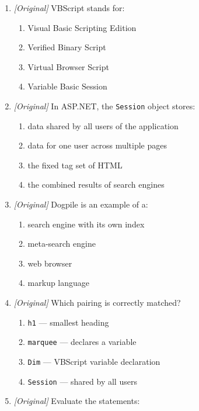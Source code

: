 \begin{enumerate}[label=\textbf{Q\arabic*.}, leftmargin=*]
\begin{enumerate}[label=\Alph*.]
    \item join two strings
    \item store data for one user on the server
  \end{enumerate}
\item \textit{[Original]} VBScript stands for:
  \begin{enumerate}[label=\Alph*.]
    \item Visual Basic Scripting Edition
    \item Verified Binary Script
    \item Virtual Browser Script
    \item Variable Basic Session
  \end{enumerate}
\item \textit{[Original]} In ASP.NET, the \texttt{Session} object stores:
  \begin{enumerate}[label=\Alph*.]
    \item data shared by all users of the application
    \item data for one user across multiple pages
    \item the fixed tag set of HTML
    \item the combined results of search engines
  \end{enumerate}
\item \textit{[Original]} Dogpile is an example of a:
  \begin{enumerate}[label=\Alph*.]
    \item search engine with its own index
    \item meta-search engine
    \item web browser
    \item markup language
  \end{enumerate}
\item \textit{[Original]} Which pairing is correctly matched?
  \begin{enumerate}[label=\Alph*.]
    \item \texttt{h1} --- smallest heading
    \item \texttt{marquee} --- declares a variable
    \item \texttt{Dim} --- VBScript variable declaration
    \item \texttt{Session} --- shared by all users
  \end{enumerate}
\item \textit{[Original]} Evaluate the statements:
  \begin{enumerate}[label=\Roman*.]

\end{enumerate}
\end{enumerate}
